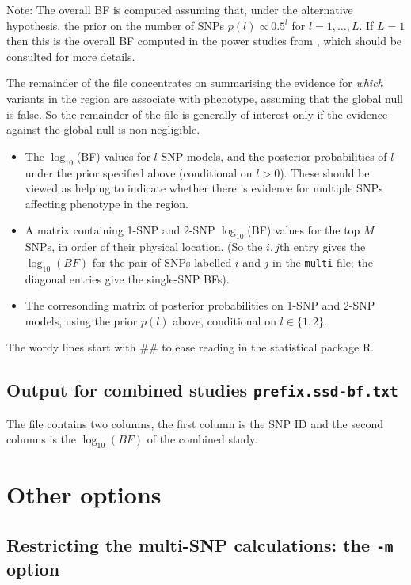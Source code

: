 \documentclass[11pt,Palatino]{article}
\begin{document}
Note: The overall BF is computed assuming that, under the alternative hypothesis,
the prior on the number of SNPs $p(l) \propto 0.5^l$ for $l=1,\dots,L$. If $L=1$ then
this is the overall BF computed in the power studies from \cite{servin.stephens.07}, which
should be consulted for more details.

The remainder of the file concentrates on summarising the evidence for {\it which} variants
in the region are associate with phenotype, assuming that the global null is false. So the remainder
of the file is generally of interest only if the evidence against the global null is non-negligible.

\begin{itemize}
\item The $\log_{10}$(BF) values for $l$-SNP models, and the posterior probabilities of $l$
under the prior specified above (conditional on $l>0$). These should be viewed as
helping to indicate whether there is evidence for multiple
SNPs affecting phenotype in the region.
\item A matrix containing 1-SNP and 2-SNP $\log_{10}$(BF) values for the top $M$ SNPs, in order of
their physical location. (So the $i,j$th entry gives the $\log_{10}(BF)$ for the pair of SNPs labelled $i$ and $j$
in the {\tt multi} file; the diagonal entries give the single-SNP BFs).
\item The corresonding matrix of posterior probabilities on 1-SNP and 2-SNP models, using the prior $p(l)$ above,
conditional on $l\in \{1,2\}$.
\end{itemize}

The wordy lines start with \#\# to ease reading in the statistical package R.

\subsection{Output for combined studies {\tt prefix.ssd-bf.txt}}
The file contains two columns, the first column is the SNP ID and the second columns is the $\log_{10}(BF)$ of the combined study. 

\section{Other options}


\subsection{Restricting the multi-SNP calculations: the {\tt -m} option}
\end{document}
